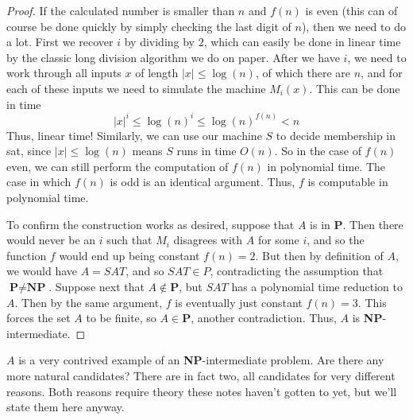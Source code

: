\begin{proof}
	\par If the calculated number is smaller than $n$ and $f(n)$ is even (this can of course be done quickly by simply checking the last digit of $n$), then we need to do a lot. First we recover $i$ by dividing by $2$, which can easily be done in linear time by the classic long division algorithm we do on paper. After we have $i$, we need to work through all inputs $x$ of length $|x| \leq \log(n)$, of which there are $n$, and for each of these inputs we need to simulate the machine $M_i(x)$. This can be done in time 
	\[ |x|^i \leq \log(n)^i \leq \log(n)^{f(n)} < n \]
Thus, linear time! Similarly, we can use our machine $S$ to decide membership in sat, since $|x| \leq \log(n)$ means $S$ runs in time $O(n)$. So in the case of $f(n)$ even, we can still perform the computation of $f(n)$ in polynomial time. The case in which $f(n)$ is odd is an identical argument. Thus, $f$ is computable in polynomial time.
	\par To confirm the construction works as desired, suppose that $A$ is in \textbf{P}. Then there would never be an $i$ such that $M_i$ disagrees with $A$ for some $i$, and so the function $f$ would end up being constant $f(n) = 2$. But then by definition of $A$, we would have $A = SAT$, and so $SAT \in P$, contradicting the assumption that $\textbf{P} \neq \textbf{NP}$. Suppose next that $A \notin \textbf{P}$, but $SAT$ has a polynomial time reduction to $A$. Then by the same argument, $f$ is eventually just constant $f(n)=3$. This forces the set $A$ to be finite, so $A \in \textbf{P}$, another contradiction. Thus, $A$ is \textbf{NP}-intermediate.
\end{proof} 
$A$ is a very contrived example of an \textbf{NP}-intermediate problem. Are there any more natural candidates? There are in fact two, all candidates for very different reasons. Both reasons require theory these notes haven't gotten to yet, but we'll state them here anyway.
